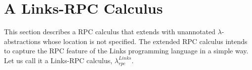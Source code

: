 \documentclass[a4paper]{article}
\theoremstyle{plain}
\theoremstyle{definition}
\newcommand{\linksrpc}{$\lambda_{rpc}^{Links}$\xspace}
\begin{document}


	
	

\section{A Links-RPC Calculus}
\label{sec:linksrpc}

This section describes a RPC calculus that extends with unannotated
$\lambda$-abstractions whose location is not specified.
%
The extended RPC calculus intends to capture the RPC feature of the
Links programming language \cite{Cooper:2006:LWP:1777707.1777724} in a
simple way.
%
Let us call it a Links-RPC calculus, \linksrpc.
\end{document}
